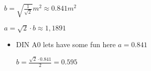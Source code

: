 \documentclass[../main.tex]{subfiles}
\begin{document}
\begin{enumerate}
	      \begin{math}
		      b = \sqrt{
			      \frac{1}{
				      \sqrt{2}
			      }
		      } m^2
		      \approx 0.841 m^2
	      \end{math}

	      \begin{math}
		      a = \sqrt{2} \cdot b
		      \approx 1,1891
	      \end{math}
	      \begin{itemize}
		      \item DIN A0
		            lets have some fun here
		            \begin{math}
			            a = 0.841
		            \end{math}

		            \begin{math}
			            b = \frac{
				            \sqrt{2} \cdot 0.841
			            }{2}
			            = 0.595
		            \end{math}
	      \end{itemize}
\end{enumerate}
\end{document}
